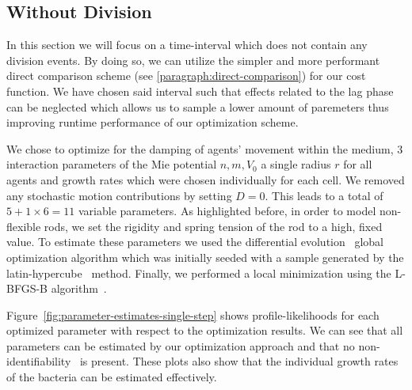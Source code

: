 \documentclass{article}
\begin{document}
\subsection{Without Division}
In this section we will focus on a time-interval which does not contain any division events.
By doing so, we can utilize the simpler and more performant direct comparison scheme (see
\ref{paragraph:direct-comparison}) for our cost function.
We have chosen said interval such that effects related to the lag phase can be neglected which
allows us to sample a lower amount of paremeters thus improving runtime performance of our
optimization scheme.

We chose to optimize for the damping of agents' movement within the medium, 3 interaction parameters
of the Mie potential $n,m,V_0$ a single radius $r$ for all agents and growth rates which were chosen
individually for each cell.
We removed any stochastic motion contributions by setting $D=0$.
This leads to a total of $5+1\times 6=11$ variable parameters.
As highlighted before, in order to model non-flexible rods, we set the rigidity and spring tension
of the rod to a high, fixed value.
To estimate these parameters we used the differential evolution~\cite{Storn1997} global optimization
algorithm which was initially seeded with a sample generated by the latin-hypercube~\cite{McKay1979}
method.
Finally, we performed a local minimization using the L-BFGS-B algorithm~\cite{Liu1989}.

Figure~\ref{fig:parameter-estimates-single-step} shows profile-likelihoods for each optimized
parameter with respect to the optimization results.
We can see that all parameters can be estimated by our optimization approach and that no
non-identifiability~\cite{Raue2009} is present.
These plots also show that the individual growth rates of the bacteria can be estimated effectively.
\end{document}
